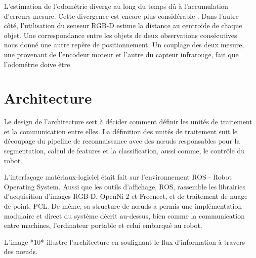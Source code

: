 L'estimation de l’odométrie diverge au long du temps dû à
l'accumulation d'erreurs mesure. Cette divergence est encore plus
considérable . Dans l'autre côté, l'utilisation du senseur RGB-D
estime la distance au centroïde de chaque objet. Une correspondance
entre les objets de deux observations consécutives nous donné une
autre repère de positionnement. Un couplage des deux mesure, une
provenant de l’encodeur moteur et l'autre du capteur infrarouge, fait
que l'odométrie doive être

\section{Architecture}

Le design de l'architecture sert à décider comment définir les unités de traitement et la communication entre elles. La définition des unités de traitement suit le découpage du pipeline de reconnaissance avec des nœuds responsables pour la segmentation, calcul de features et la classification, aussi comme, le contrôle du robot.

L'interfaçage matériaux-logiciel était fait sur l'environnement ROS -
Robot Operating System. Aussi que les outils d'affichage, ROS, 
rassemble les librairies d'acquisition d'images RGB-D, OpenNi 2 et Freenect, et de traitement de nuage de point, PCL.
De même, sa structure de nœuds a permis une implémentation modulaire et direct du
système décrit au-dessus, bien comme la communication entre machines, l'ordinateur portable et celui embarqué au robot.

L'image *10* illustre l'architecture en soulignant le flux d'information à travers des nœuds.




